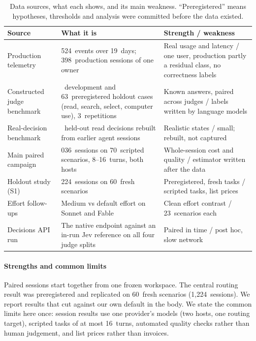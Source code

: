 \documentclass[11pt,letterpaper]{article}
\newcommand{\EcScen}{23}
\newcommand{\MaxTurns}{16}
\newcommand{\MinTurns}{8}
\newcommand{\NScenarios}{70}
\newcommand{\NSessions}{1{,}036}
\newcommand{\ObDays}{19}
\newcommand{\ObEvents}{464{,}524}
\newcommand{\ObProdSessions}{398}
\newcommand{\SOnePanelN}{60}
\newcommand{\SOneSessions}{1{,}224}
\newcommand{\DevN}{90}
\newcommand{\HoldN}{63}
\newcommand{\HoldReps}{3}
\newcommand{\TrN}{42}
\begin{document}
\begin{table}[htbp]
\centering\small
\caption{Data sources, what each shows, and its main weakness. ``Preregistered'' means hypotheses, thresholds and
analysis were committed before the data existed.}
\label{tab:data}
\begin{tabularx}{\textwidth}{@{}>{\raggedright\arraybackslash}p{} >{\raggedright\arraybackslash}X
  >{\raggedright\arraybackslash}p{}@{}}
\toprule
Source & What it is & Strength / weakness \\
\midrule
Production telemetry & \ObEvents\ events over \ObDays\ days; \ObProdSessions\ production sessions of one owner &
  Real usage and latency / one user, production partly a residual class, no correctness labels \\
Constructed judge benchmark & \DevN\ development and \HoldN\ preregistered holdout cases (read, search, select,
  computer use), \HoldReps\ repetitions & Known answers, paired across judges / labels written by language models \\
Real-decision benchmark & \TrN\ held-out read decisions rebuilt from earlier agent sessions & Realistic states /
  small; rebuilt, not captured \\
Main paired campaign & \NSessions\ sessions on \NScenarios\ scripted scenarios, \MinTurns--\MaxTurns\ turns, both hosts &
  Whole-session cost and quality / estimator written after the data \\
Holdout study (S1) & \SOneSessions\ sessions on \SOnePanelN\ fresh scenarios & Preregistered, fresh tasks / scripted
  tasks, list prices \\
Effort follow-ups & Medium vs default effort on Sonnet and Fable & Clean effort contrast / \EcScen\ scenarios each \\
Decisions API run & The native endpoint against an in-run Jev reference on all four judge splits & Paired in time /
  post hoc, slow network \\
\bottomrule
\end{tabularx}
\end{table}

\paragraph{Strengths and common limits} Paired sessions start together from one frozen workspace. The central routing
result was preregistered and replicated on \SOnePanelN\ fresh scenarios (\SOneSessions\ sessions). We report results that cut
against our own default in the body. We state the common limits here once: session results use
one provider's models (two hosts, one routing target), scripted tasks of at most \MaxTurns\ turns, automated quality
checks rather than human judgement, and list prices rather than invoices.
\end{document}
